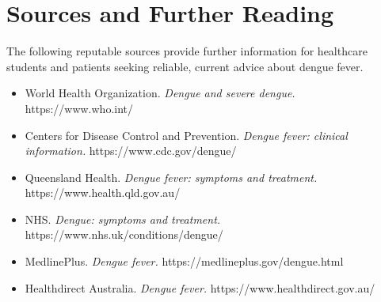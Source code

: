\section*{Sources and Further Reading}
The following reputable sources provide further information for healthcare students and patients seeking reliable, current advice about dengue fever.

\begin{itemize}
    \item World Health Organization. \textit{Dengue and severe dengue.} https://www.who.int/
    \item Centers for Disease Control and Prevention. \textit{Dengue fever: clinical information.} https://www.cdc.gov/dengue/
    \item Queensland Health. \textit{Dengue fever: symptoms and treatment.} https://www.health.qld.gov.au/
    \item NHS. \textit{Dengue: symptoms and treatment.} https://www.nhs.uk/conditions/dengue/
    \item MedlinePlus. \textit{Dengue fever.} https://medlineplus.gov/dengue.html
    \item Healthdirect Australia. \textit{Dengue fever.} https://www.healthdirect.gov.au/
\end{itemize}
